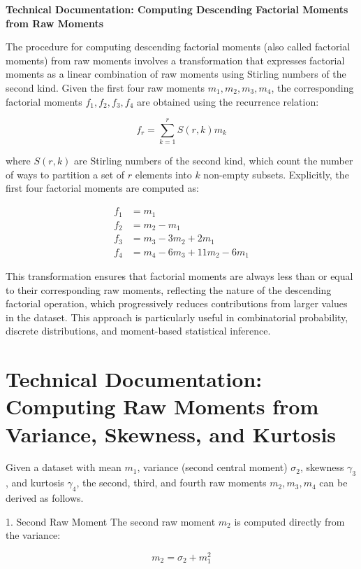 \documentclass{article}
\begin{document}
	
	\noindent \textbf{Technical Documentation: Computing Descending Factorial Moments from Raw Moments}
	
	\medskip
	\noindent The procedure for computing descending factorial moments (also called factorial moments) from raw moments involves a transformation that expresses factorial moments as a linear combination of raw moments using Stirling numbers of the second kind. Given the first four raw moments $m_1, m_2, m_3, m_4$, the corresponding factorial moments $f_1, f_2, f_3, f_4$ are obtained using the recurrence relation:
	
	\begin{equation*}
		f_r = \sum_{k=1}^{r} S(r, k)m_k
	\end{equation*}
	
	\noindent where $S(r, k)$ are Stirling numbers of the second kind, which count the number of ways to partition a set of $r$ elements into $k$ non-empty subsets. Explicitly, the first four factorial moments are computed as:
	
	\begin{align*}
		f_1 &= m_1 \\
		f_2 &= m_2 - m_1 \\
		f_3 &= m_3 - 3m_2 + 2m_1 \\
		f_4 &= m_4 - 6m_3 + 11m_2 - 6m_1
	\end{align*}
	
	\noindent This transformation ensures that factorial moments are always less than or equal to their corresponding raw moments, reflecting the nature of the descending factorial operation, which progressively reduces contributions from larger values in the dataset. This approach is particularly useful in combinatorial probability, discrete distributions, and moment-based statistical inference.

\section*{Technical Documentation: Computing Raw Moments from Variance, Skewness, and Kurtosis}

Given a dataset with mean \( m_1 \), variance (second central moment) \( \sigma_2 \), skewness \( \gamma_3 \), and kurtosis \( \gamma_4 \), the second, third, and fourth raw moments \( m_2, m_3, m_4 \) can be derived as follows.

1. Second Raw Moment
The second raw moment \( m_2 \) is computed directly from the variance:

\[
m_2 = \sigma_2 + m_1^2
\]
\end{document}
